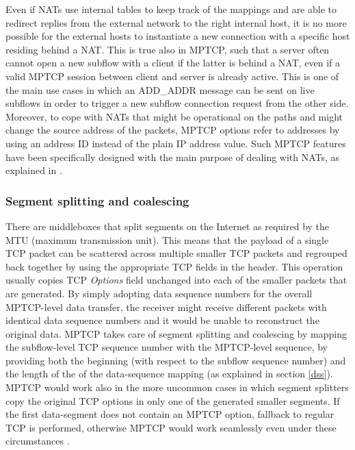 Even if NATs use internal tables to keep track of the mappings and are able to redirect replies from the external network to the right internal host, it is no more possible for the external hosts to instantiate a new connection with a specific host residing behind a NAT. This is true also in MPTCP, such that a server often cannot open a new subflow with a client if the latter is behind a NAT, even if a valid MPTCP session between client and server is already active. This is one of the main use cases in which an ADD\_ADDR message can be sent on live subflows in order to trigger a new subflow connection request from the other side. Moreover, to cope with NATs that might be operational on the paths and might change the source address of the packets, MPTCP options refer to addresses by using an address ID instead of the plain IP address value. Such MPTCP features have been specifically designed with the main purpose of dealing with NATs, as explained in .

\subsubsection{Segment splitting and coalescing}
There are middleboxes that split segments on the Internet as required by the MTU (maximum transmission unit). This means that the payload of a single TCP packet can be scattered across multiple smaller TCP packets and regrouped back together by using the appropriate TCP fields in the header. This operation usually copies TCP \textit{Options} field unchanged into each of the smaller packets that are generated. By simply adopting data sequence numbers for the overall MPTCP-level data transfer, the receiver might receive different packets with identical data sequence numbers and it would be unable to reconstruct the original data. MPTCP takes care of segment splitting and coalescing by mapping the subflow-level TCP sequence number with the MPTCP-level sequence, by providing both the beginning (with respect to the subflow sequence number) and the length of the of the data-sequence mapping (as explained in section \ref{dss}).
MPTCP would work also in the more uncommon cases in which segment splitters copy the original TCP options in only one of the generated smaller segments. If the first data-segment does not contain an MPTCP option, fallback to regular TCP is performed, otherwise MPTCP would work seamlessly even under these circumstances \cite{HDPDB13}.

